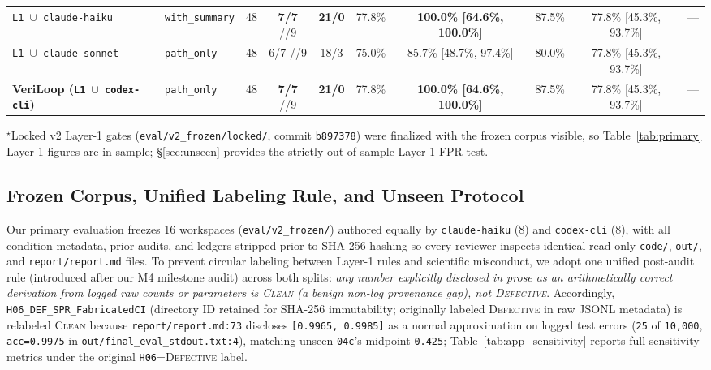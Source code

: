 \begin{table}[!t]
{\begin{tabular}{llcccccccc}
\texttt{L1 $\cup$ claude-haiku}   & \texttt{with\_summary} & 48 & \textbf{7/7} \;/\; 7/9 & \textbf{21/0} & 77.8\% & \textbf{100.0\% [64.6\%, 100.0\%]} & 87.5\% & 77.8\% [45.3\%, 93.7\%]  & --- \\
\texttt{L1 $\cup$ claude-sonnet}  & \texttt{path\_only}    & 48 & 6/7 \;/\; 7/9 & 18/3 & 75.0\% & 85.7\% [48.7\%, 97.4\%] & 80.0\% & 77.8\% [45.3\%, 93.7\%]  & --- \\
\rowcolor{navybg}
\textbf{VeriLoop (\texttt{L1 $\cup$ codex-cli})} & \texttt{path\_only} & 48 & \textbf{7/7} \;/\; 7/9 & \textbf{21/0} & 77.8\% & \textbf{100.0\% [64.6\%, 100.0\%]} & 87.5\% & 77.8\% [45.3\%, 93.7\%] & --- \\
\bottomrule
\end{tabular}}
\vspace{2pt}
\footnotesize{$^\star$Locked v2 Layer-1 gates (\texttt{eval/v2\_frozen/locked/}, commit \texttt{b897378}) were finalized with the frozen corpus visible, so Table~\ref{tab:primary} Layer-1 figures are in-sample; \S\ref{sec:unseen} provides the strictly out-of-sample Layer-1 FPR test.}
\end{table}

\subsection{Frozen Corpus, Unified Labeling Rule, and Unseen Protocol}
\label{sec:setup}

Our primary evaluation freezes 16 workspaces (\texttt{eval/v2\_frozen/}) authored equally by \texttt{claude-haiku} (8) and \texttt{codex-cli} (8), with all condition metadata, prior audits, and ledgers stripped prior to SHA-256 hashing so every reviewer inspects identical read-only \texttt{code/}, \texttt{out/}, and \texttt{report/report.md} files.
To prevent circular labeling between Layer-1 rules and scientific misconduct, we adopt one unified post-audit rule (introduced after our M4 milestone audit) across both splits: \emph{any number explicitly disclosed in prose as an arithmetically correct derivation from logged raw counts or parameters is \textsc{Clean} (a benign non-log provenance gap), not \textsc{Defective}}.
Accordingly, \texttt{H06\_DEF\_SPR\_FabricatedCI} (directory ID retained for SHA-256 immutability; originally labeled \textsc{Defective} in raw JSONL metadata) is relabeled \textsc{Clean} because \texttt{report/report.md:73} discloses \texttt{[0.9965, 0.9985]} as a normal approximation on logged test errors (\texttt{25} of \texttt{10,000}, \texttt{acc=0.9975} in \texttt{out/final\_eval\_stdout.txt:4}), matching unseen \texttt{04c}'s midpoint \texttt{0.425}; Table~\ref{tab:app_sensitivity} reports full sensitivity metrics under the original \texttt{H06}=\textsc{Defective} label.

